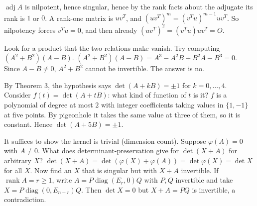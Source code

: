 \documentclass[11pt,a4paper]{article}
\begin{document}
\(\operatorname{adj}A\) is nilpotent, hence singular, hence by the rank facts about the adjugate its rank is \(1\) or \(0\).
A rank-one matrix is \(uv^T\), and \((uv^T)^m=(v^Tu)^{m-1}uv^T\). So nilpotency forces \(v^Tu=0\), and then already \((uv^T)^2=(v^Tu)uv^T=O\).

Look for a product that the two relations make vanish. Try computing \((A^2+B^2)(A-B)\).
\((A^2+B^2)(A-B)=A^3-A^2B+B^2A-B^3=0\). Since \(A-B\ne 0\), \(A^2+B^2\) cannot be invertible. The answer is no.

By Theorem 3, the hypothesis says \(\det(A+kB)=\pm1\) for \(k=0,\dots,4\). Consider \(f(t)=\det(A+tB)\): what kind of function of \(t\) is it?
\(f\) is a polynomial of degree at most \(2\) with integer coefficients taking values in \(\{1,-1\}\) at five points. By pigeonhole it takes the same value at three of them, so it is constant. Hence \(\det(A+5B)=\pm1\).

It suffices to show the kernel is trivial (dimension count). Suppose \(\varphi(A)=0\) with \(A\ne0\). What does determinant-preservation give for \(\det(X+A)\) for arbitrary \(X\)?
\(\det(X+A)=\det(\varphi(X)+\varphi(A))=\det\varphi(X)=\det X\) for all \(X\). Now find an \(X\) that is singular but with \(X+A\) invertible.
If \(\operatorname{rank}A=r\ge1\), write \(A=P\operatorname{diag}(E_r,0)Q\) with \(P,Q\) invertible and take \(X=P\operatorname{diag}(0,E_{n-r})Q\). Then \(\det X=0\) but \(X+A=PQ\) is invertible, a contradiction.
\end{document}
